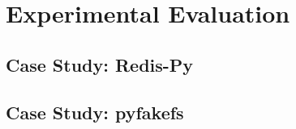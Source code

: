 \section{Experimental Evaluation}

\subsection {Case Study: Redis-Py}

\subsection {Case Study: pyfakefs}